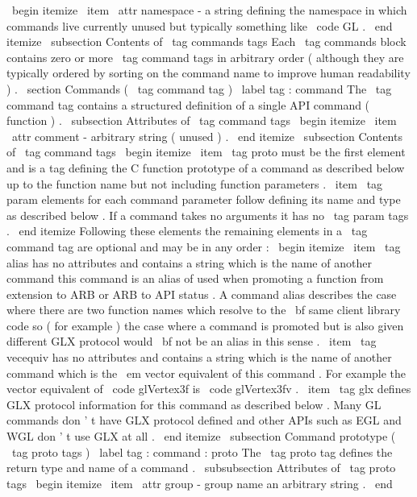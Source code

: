 \
begin
{
itemize
}
\
item
\
attr
{
namespace
}
-
a
string
defining
the
namespace
in
which
commands
live
currently
unused
but
typically
something
like
\
code
{
GL
}
.
\
end
{
itemize
}
\
subsection
{
Contents
of
\
tag
{
commands
}
tags
}
Each
\
tag
{
commands
}
block
contains
zero
or
more
\
tag
{
command
}
tags
in
arbitrary
order
(
although
they
are
typically
ordered
by
sorting
on
the
command
name
to
improve
human
readability
)
.
\
section
{
Commands
(
\
tag
{
command
}
tag
)
}
\
label
{
tag
:
command
}
The
\
tag
{
command
}
tag
contains
a
structured
definition
of
a
single
API
command
(
function
)
.
\
subsection
{
Attributes
of
\
tag
{
command
}
tags
}
\
begin
{
itemize
}
\
item
\
attr
{
comment
}
-
arbitrary
string
(
unused
)
.
\
end
{
itemize
}
\
subsection
{
Contents
of
\
tag
{
command
}
tags
}
\
begin
{
itemize
}
\
item
\
tag
{
proto
}
must
be
the
first
element
and
is
a
tag
defining
the
C
function
prototype
of
a
command
as
described
below
up
to
the
function
name
but
not
including
function
parameters
.
\
item
\
tag
{
param
}
elements
for
each
command
parameter
follow
defining
its
name
and
type
as
described
below
.
If
a
command
takes
no
arguments
it
has
no
\
tag
{
param
}
tags
.
\
end
{
itemize
}
Following
these
elements
the
remaining
elements
in
a
\
tag
{
command
}
tag
are
optional
and
may
be
in
any
order
:
\
begin
{
itemize
}
\
item
\
tag
{
alias
}
has
no
attributes
and
contains
a
string
which
is
the
name
of
another
command
this
command
is
an
alias
of
used
when
promoting
a
function
from
extension
to
ARB
or
ARB
to
API
status
.
A
command
alias
describes
the
case
where
there
are
two
function
names
which
resolve
to
the
{
\
bf
same
}
client
library
code
so
(
for
example
)
the
case
where
a
command
is
promoted
but
is
also
given
different
GLX
protocol
would
{
\
bf
not
}
be
an
alias
in
this
sense
.
\
item
\
tag
{
vecequiv
}
has
no
attributes
and
contains
a
string
which
is
the
name
of
another
command
which
is
the
{
\
em
vector
equivalent
}
of
this
command
.
For
example
the
vector
equivalent
of
\
code
{
glVertex3f
}
is
\
code
{
glVertex3fv
}
.
\
item
\
tag
{
glx
}
defines
GLX
protocol
information
for
this
command
as
described
below
.
Many
GL
commands
don
'
t
have
GLX
protocol
defined
and
other
APIs
such
as
EGL
and
WGL
don
'
t
use
GLX
at
all
.
\
end
{
itemize
}
\
subsection
{
Command
prototype
(
\
tag
{
proto
}
tags
)
}
\
label
{
tag
:
command
:
proto
}
The
\
tag
{
proto
}
tag
defines
the
return
type
and
name
of
a
command
.
\
subsubsection
{
Attributes
of
\
tag
{
proto
}
tags
}
\
begin
{
itemize
}
\
item
\
attr
{
group
}
-
group
name
an
arbitrary
string
.
\
end
